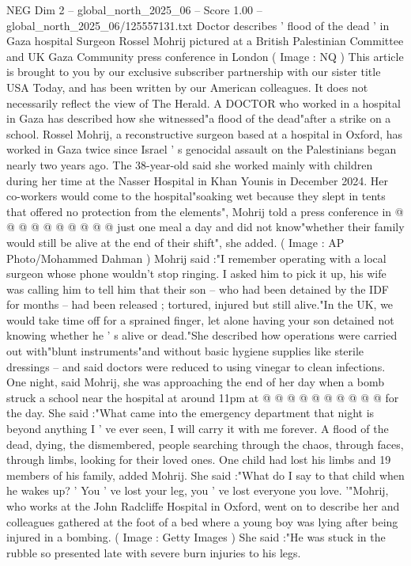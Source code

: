 \begin{textsample}{NEG Dim 2 – global\_north\_2025\_06 – Score 1.00 – global\_north\_2025\_06/125557131.txt}  \label{ex:f2_neg_093}
Doctor describes ' flood of the dead ' in Gaza hospital Surgeon Rossel Mohrij pictured at a British Palestinian Committee and UK Gaza Community press conference in London ( Image : NQ ) This article is brought to you by our exclusive subscriber partnership with our sister title USA Today, and has been written by our American colleagues.
It does not necessarily reflect the view of The Herald.
A DOCTOR who worked in a hospital in Gaza has described how she witnessed"a flood of the dead"after a strike on a school.
Rossel Mohrij, a reconstructive surgeon based at a hospital in Oxford, has worked in Gaza twice since Israel ' s genocidal assault on the Palestinians began nearly two years ago.
The 38-year-old said she worked mainly with children during her time at the Nasser Hospital in Khan Younis in December 2024.
Her co-workers would come to the hospital"soaking wet because they slept in tents that offered no protection from the elements", Mohrij told a press conference in @ @ @ @ @ @ @ @ @ @ just one meal a day and did not know"whether their family would still be alive at the end of their shift", she added. ( Image : AP Photo/Mohammed Dahman ) Mohrij said :"I remember operating with a local surgeon whose phone wouldn't stop ringing.
I asked him to pick it up, his wife was calling him to tell him that their son -- who had been detained by the IDF for months -- had been released ; tortured, injured but still alive."In the UK, we would take time off for a sprained finger, let alone having your son detained not knowing whether he ' s alive or dead."She described how operations were carried out with"blunt instruments"and without basic hygiene supplies like sterile dressings -- and said doctors were reduced to using vinegar to clean infections.
One night, said Mohrij, she was approaching the end of her day when a bomb struck a school near the hospital at around 11pm at @ @ @ @ @ @ @ @ @ @ for the day.
She said :"What came into the emergency department that night is beyond anything I ' ve ever seen, I will carry it with me forever.
A flood of the dead, dying, the dismembered, people searching through the chaos, through faces, through limbs, looking for their loved ones.
One child had lost his limbs and 19 members of his family, added Mohrij.
She said :"What do I say to that child when he wakes up? ' You ' ve lost your leg, you ' ve lost everyone you love. '"Mohrij, who works at the John Radcliffe Hospital in Oxford, went on to describe her and colleagues gathered at the foot of a bed where a young boy was lying after being injured in a bombing. ( Image : Getty Images ) She said :"He was stuck in the rubble so presented late with severe burn injuries to his legs.

\end{textsample}
